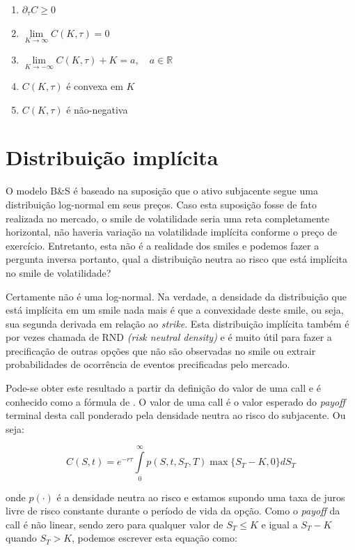 \documentclass[]{book}
\providecommand{\tightlist}{%
  \setlength{\itemsep}{0pt}\setlength{\parskip}{0pt}}
\begin{document}
\begin{enumerate}
\def\labelenumi{\arabic{enumi}.}
\tightlist
\item
  \(\partial_\tau C \geq 0\)
\item
  \(\lim\limits_{K\rightarrow\infty}C(K, \tau)=0\)
\item
  \(\lim\limits_{K\rightarrow-\infty}C(K, \tau)+K=a, \quad a \in \mathbb R\)
\item
  \(C(K, \tau)\) é convexa em \(K\)
\item
  \(C(K, \tau)\) é não-negativa
\end{enumerate}

\section{Distribuição implícita}\label{distribuicao-implicita}

O modelo B\&S é baseado na suposição que o ativo subjacente segue uma
distribuição log-normal em seus preços. Caso esta suposição fosse de
fato realizada no mercado, o smile de volatilidade seria uma reta
completamente horizontal, não haveria variação na volatilidade implícita
conforme o preço de exercício. Entretanto, esta não é a realidade dos
smiles e podemos fazer a pergunta inversa portanto, qual a distribuição
neutra ao risco que está implícita no smile de volatilidade?

Certamente não é uma log-normal. Na verdade, a densidade da distribuição
que está implícita em um smile nada mais é que a convexidade deste
smile, ou seja, sua segunda derivada em relação ao \emph{strike}. Esta
distribuição implícita também é por vezes chamada de RND \emph{(risk
neutral density)} e é muito útil para fazer a precificação de outras
opções que não são observadas no smile ou extrair probabilidades de
ocorrência de eventos precificadas pelo mercado.

Pode-se obter este resultado a partir da definição do valor de uma call
e é conhecido como a fórmula de \citet{Breeden1978}. O valor de uma call
é o valor esperado do \emph{payoff} terminal desta call ponderado pela
densidade neutra ao risco do subjacente. Ou seja:

\begin{equation}
C(S, t)=e^{-r\tau}\int\limits_{0}^\infty p(S,t,S_T,T)\max\{S_T-K, 0\}dS_T
\end{equation}

onde \(p(\cdot)\) é a densidade neutra ao risco e estamos supondo uma
taxa de juros livre de risco constante durante o período de vida da
opção. Como o \emph{payoff} da call é não linear, sendo zero para
qualquer valor de \(S_T \leq K\) e igual a \(S_T-K\) quando \(S_T > K\),
podemos escrever esta equação como:
\end{document}
